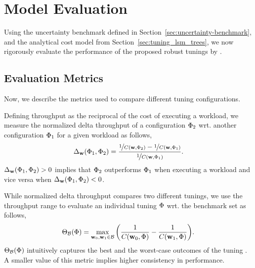 
\section{Model Evaluation}
\label{sec:model-evaluation}

Using the uncertainty benchmark defined in Section~\ref{sec:uncertainty-benchmark},
    and the analytical cost model from Section~\ref{sec:tuning_lsm_trees},
    we now rigorously evaluate the performance of the proposed robust tunings by
    {\Endure}.

\subsection{Evaluation Metrics}
Now, we describe the metrics used to compare different tuning configurations.

 Defining throughput as the 
    reciprocal of the cost of executing a workload, we measure the
    normalized delta throughput of a configuration {${{\Phi}}_2$}
    wrt. another configuration {${{\Phi}}_1$} for a given 
    workload {\workload} as follows, 
    \[
        \Delta_{{{\bf{w}}}}({{\Phi}}_1, {{\Phi}}_2) = 
        \frac{\nicefrac{1}{C({{\bf{w}}}, {{\Phi}}_2)} -
            \nicefrac{1}{C({{\bf{w}}}, {{\Phi}}_1)}}
            {\nicefrac{1}{C({{\bf{w}}}, {{\Phi}}_1)}}.
    \]
$\Delta_{{{\bf{w}}}}({{\Phi}}_1, {{\Phi}}_2) > 0$ implies that
    {${{\Phi}}_2$} outperforms {${{\Phi}}_1$} when executing
    a workload {\workload} and vice versa when
    $\Delta_{{{\bf{w}}}}({{\Phi}}_1, {{\Phi}}_2) < 0$.

 While normalized delta throughput 
    compares two different tunings, we use the throughput
    range to evaluate an individual tuning ${{{\Phi}}}$ 
    wrt. the  benchmark set {\benchmark} as follows,
    \[
        \Theta_{\mathcal{B}}({{\Phi}}) = 
        \max_{{{\bf{w}}}_0, {{\bf{w}}}_1 \in \mathcal{B}}
            \bigg(\frac{1}{C({{\bf{w}}}_0, {{\Phi}})} 
            - \frac{1}{C({{\bf{w}}}_1, {{\Phi}})}\bigg).
    \]
$\Theta_{{{\mathcal{B}}}}({{\Phi}})$ intuitively captures the best
    and the worst-case outcomes of the tuning {\configuration}.
A smaller value of this metric implies higher consistency in performance.

